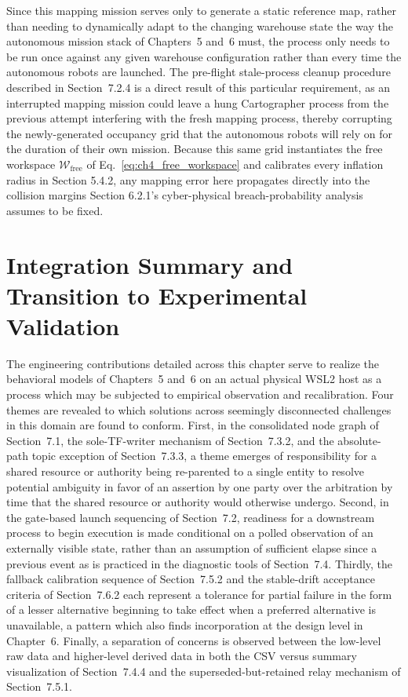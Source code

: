 Since this mapping mission serves only to generate a static reference map, rather than needing to dynamically adapt to the changing warehouse state the way the autonomous mission stack of Chapters~5 and~6 must, the process only needs to be run once against any given warehouse configuration rather than every time the autonomous robots are launched. The pre-flight stale-process cleanup procedure described in Section~7.2.4 is a direct result of this particular requirement, as an interrupted mapping mission could leave a hung Cartographer process from the previous attempt interfering with the fresh mapping process, thereby corrupting the newly-generated occupancy grid that the autonomous robots will rely on for the duration of their own mission. Because this same grid instantiates the free workspace $\mathcal{W}_{\text{free}}$ of Eq.~\eqref{eq:ch4_free_workspace} and calibrates every inflation radius in Section 5.4.2, any mapping error here propagates directly into the collision margins Section 6.2.1's cyber-physical breach-probability analysis assumes to be fixed.

\section{Integration Summary and Transition to Experimental Validation}

The engineering contributions detailed across this chapter serve to realize the behavioral models of Chapters~5 and~6 on an actual physical WSL2 host as a process which may be subjected to empirical observation and recalibration. Four themes are revealed to which solutions across seemingly disconnected challenges in this domain are found to conform. First, in the consolidated node graph of Section~7.1, the sole-TF-writer mechanism of Section~7.3.2, and the absolute-path topic exception of Section~7.3.3, a theme emerges of responsibility for a shared resource or authority being re-parented to a single entity to resolve potential ambiguity in favor of an assertion by one party over the arbitration by time that the shared resource or authority would otherwise undergo. Second, in the gate-based launch sequencing of Section~7.2, readiness for a downstream process to begin execution is made conditional on a polled observation of an externally visible state, rather than an assumption of sufficient elapse since a previous event as is practiced in the diagnostic tools of Section~7.4. Thirdly, the fallback calibration sequence of Section~7.5.2 and the stable-drift acceptance criteria of Section~7.6.2 each represent a tolerance for partial failure in the form of a lesser alternative beginning to take effect when a preferred alternative is unavailable, a pattern which also finds incorporation at the design level in Chapter~6. Finally, a separation of concerns is observed between the low-level raw data and higher-level derived data in both the CSV versus summary visualization of Section~7.4.4 and the superseded-but-retained relay mechanism of Section~7.5.1.

